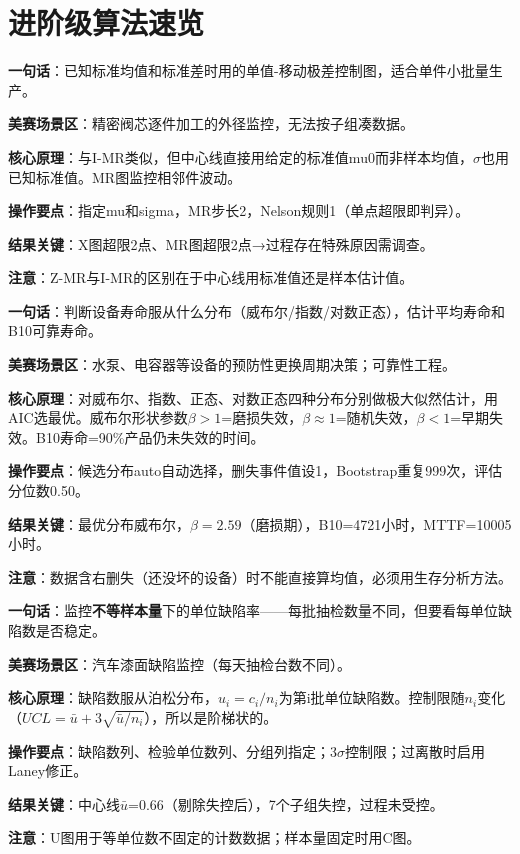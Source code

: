 \section{进阶级算法速览}


\begin{algobrief}
\textbf{一句话}：已知标准均值和标准差时用的单值-移动极差控制图，适合单件小批量生产。

\textbf{美赛场景区}：精密阀芯逐件加工的外径监控，无法按子组凑数据。

\textbf{核心原理}：与I-MR类似，但中心线直接用给定的标准值mu0而非样本均值，$\sigma$也用已知标准值。MR图监控相邻件波动。

\textbf{操作要点}：指定mu和sigma，MR步长2，Nelson规则1（单点超限即判异）。

\textbf{结果关键}：X图超限2点、MR图超限2点→过程存在特殊原因需调查。

\textbf{注意}：Z-MR与I-MR的区别在于中心线用标准值还是样本估计值。
\end{algobrief}


\begin{algobrief}
\textbf{一句话}：判断设备寿命服从什么分布（威布尔/指数/对数正态），估计平均寿命和B10可靠寿命。

\textbf{美赛场景区}：水泵、电容器等设备的预防性更换周期决策；可靠性工程。

\textbf{核心原理}：对威布尔、指数、正态、对数正态四种分布分别做极大似然估计，用AIC选最优。威布尔形状参数$\beta>1$=磨损失效，$\beta\approx1$=随机失效，$\beta<1$=早期失效。B10寿命=90\%产品仍未失效的时间。

\textbf{操作要点}：候选分布auto自动选择，删失事件值设1，Bootstrap重复999次，评估分位数0.50。

\textbf{结果关键}：最优分布威布尔，$\beta=2.59$（磨损期），B10=4721小时，MTTF=10005小时。

\textbf{注意}：数据含右删失（还没坏的设备）时不能直接算均值，必须用生存分析方法。
\end{algobrief}


\begin{algobrief}
\textbf{一句话}：监控\textbf{不等样本量}下的单位缺陷率——每批抽检数量不同，但要看每单位缺陷数是否稳定。

\textbf{美赛场景区}：汽车漆面缺陷监控（每天抽检台数不同）。

\textbf{核心原理}：缺陷数服从泊松分布，$u_i=c_i/n_i$为第i批单位缺陷数。控制限随$n_i$变化（$UCL=\bar{u}+3\sqrt{\bar{u}/n_i}$），所以是阶梯状的。

\textbf{操作要点}：缺陷数列、检验单位数列、分组列指定；3$\sigma$控制限；过离散时启用Laney修正。

\textbf{结果关键}：中心线$\bar{u}$=0.66（剔除失控后），7个子组失控，过程未受控。

\textbf{注意}：U图用于等单位数不固定的计数数据；样本量固定时用C图。
\end{algobrief}

